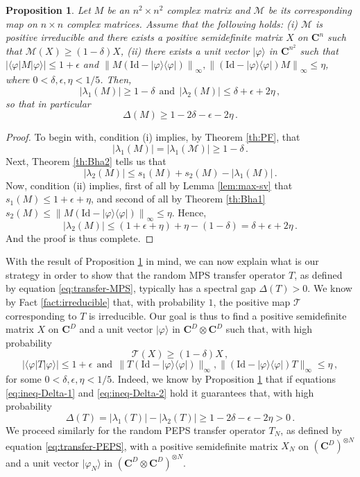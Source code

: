 \documentclass{amsart}
\newtheorem{proposition}[theorem]{Proposition}
\newcommand{\C}{\mathbf{C}}
\renewcommand{\leq}{\leqslant}
\renewcommand{\geq}{\geqslant}
\newcommand{\Id}{\mathrm{Id}}
\newcommand{\ketbra}[2]{| #1 \rangle\!\langle #2 |}
\newcommand{\bra}[1]{\langle #1 |}
\newcommand{\ket}[1]{| #1 \rangle}
\begin{document}
\begin{proposition} \label{prop:spectral-gap}
    Let $M$ be an $n^2\times n^2$ complex matrix and $\mathcal M$ be its corresponding map on $n\times n$ complex matrices. Assume that the following holds: (i) $\mathcal M$ is positive irreducible and there exists a positive semidefinite matrix $X$ on $\C^n$ such that $\mathcal M(X)\geq (1-\delta) X$, (ii) there exists a unit vector $\ket{\varphi}$ in $\C^{n^2}$ such that $|\bra{\varphi}M\ket{\varphi}| \leq 1+\epsilon$ and $\left\|M\left(\Id-\ketbra{\varphi}{\varphi}\right)\right\|_{\infty},\left\|\left(\Id-\ketbra{\varphi}{\varphi}\right)M\right\|_{\infty}\leq \eta$, where $0<\delta,\epsilon,\eta<1/5$. Then,
    \[ |\lambda_1(M)|\geq 1-\delta\ \ \text{and}\ \ |\lambda_2(M)|\leq \delta+ \epsilon+2\eta \, , \]
    so that in particular
    \[ \Delta(M)\geq 1-2\delta-\epsilon-2\eta\, . \]
\end{proposition}

\begin{proof}
    To begin with, condition (i) implies, by Theorem \ref{th:PF}, that
    \[ |\lambda_1(M)| = |\lambda_1(\mathcal M)| \geq 1 -\delta \, . \]
    Next, Theorem \ref{th:Bha2} tells us that
    \[ |\lambda_2(M)| \leq s_1(M) + s_2(M) - |\lambda_1(M)| \, .  \]
    Now, condition (ii) implies, first of all by Lemma \ref{lem:max-sv} that $s_1(M)\leq 1+\epsilon+\eta$, and second of all by Theorem \ref{th:Bha1} $s_2(M)\leq \left\|M\left(\Id-\ketbra{\varphi}{\varphi}\right)\right\|_{\infty}\leq \eta$. Hence,
    \[ |\lambda_2(M)| \leq (1+\epsilon+\eta)+\eta-(1-\delta) =\delta+ \epsilon+2\eta \, .\]
    And the proof is thus complete.
\end{proof}

With the result of Proposition \ref{prop:spectral-gap} in mind, we can now explain what is our strategy in order to show that the random MPS transfer operator $T$, as defined by equation \eqref{eq:transfer-MPS}, typically has a spectral gap $\Delta(T)>0$. We know by Fact \ref{fact:irreducible} that, with probability $1$, the positive map $\mathcal T$ corresponding to $T$ is irreducible. Our goal is thus to find a positive semidefinite matrix $X$ on $\C^D$ and a unit vector $\ket{\varphi}$ in  $\C^D\otimes\C^D$ such that, with high probability
\begin{equation} \label{eq:ineq-Delta-1}
    \mathcal T(X) \geq (1-\delta)X \, ,
\end{equation}
\begin{equation} \label{eq:ineq-Delta-2}
    |\bra{\varphi}T\ket{\varphi}| \leq 1+\epsilon \ \ \text{and} \ \  \|T(\Id-\ketbra{\varphi}{\varphi})\|_{\infty},\|(\Id-\ketbra{\varphi}{\varphi})T\|_{\infty} \leq \eta \, ,
\end{equation}
for some $0<\delta,\epsilon,\eta<1/5$. Indeed, we know by Proposition \ref{prop:spectral-gap} that if equations \eqref{eq:ineq-Delta-1} and \eqref{eq:ineq-Delta-2} hold it guarantees that, with high probability
\[ \Delta(T) = |\lambda_1(T)| - |\lambda_2(T)| \geq 1-2\delta-\epsilon-2\eta >0 \, . \]
We proceed similarly for the random PEPS transfer operator $T_N$, as defined by equation \eqref{eq:transfer-PEPS}, with a positive semidefinite matrix $X_N$ on $(\C^D)^{\otimes N}$ and a unit vector $\ket{\varphi_N}$ in $(\C^D\otimes\C^D)^{\otimes N}$.
\end{document}
